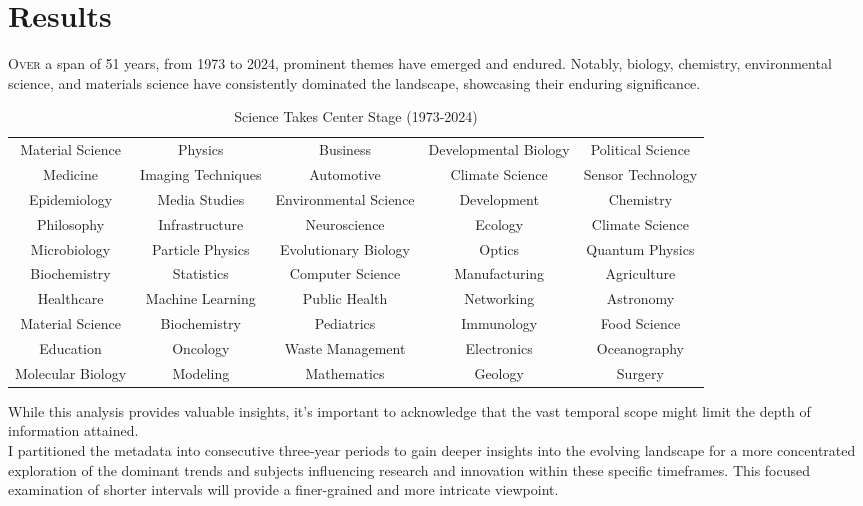 \chapter{Results}
\lettrine[lines=1]{O}{ver}
 a span of 51 years, from 1973 to 2024, prominent themes have emerged and endured. Notably, biology, chemistry, environmental science, and materials science have consistently dominated the landscape, showcasing their enduring significance. 
\begin{table}[H]

    \caption{Science Takes Center Stage (1973-2024)}
    \label{tab: Topic List}

    \begin{adjustbox}{width=\textwidth} 
        \begin{tabular}{ *{5}{c} } 

            \midrule
            Material Science	&	Physics	&	Business	&	Developmental Biology	&	Political Science	\\
Medicine	&	Imaging Techniques	&	Automotive	&	Climate Science	&	Sensor Technology	\\
Epidemiology	&	Media Studies	&	Environmental Science	&	Development	&	Chemistry	\\
Philosophy	&	Infrastructure	&	Neuroscience	&	Ecology	&	Climate Science	\\
Microbiology	&	Particle Physics	&	Evolutionary Biology	&	Optics	&	Quantum Physics	\\
Biochemistry	&	Statistics	&	Computer Science	&	Manufacturing	&	Agriculture	\\
Healthcare	&	Machine Learning	&	Public Health	&	Networking	&	Astronomy	\\
Material Science	&	Biochemistry	&	Pediatrics	&	Immunology	&	Food Science	\\
Education	&	Oncology	&	Waste Management	&	Electronics	&	Oceanography	\\
Molecular Biology	&	Modeling	&	Mathematics	&	Geology	&	Surgery	\\

            \bottomrule
        \end{tabular}
    \end{adjustbox}
\end{table}
While this analysis provides valuable insights, it's important to acknowledge that the vast temporal scope might limit the depth of information attained. \\

I partitioned the metadata into consecutive three-year periods to gain deeper insights into the evolving landscape for a more concentrated exploration of the dominant trends and subjects influencing research and innovation within these specific timeframes. This focused examination of shorter intervals will provide a finer-grained and more intricate viewpoint. 

